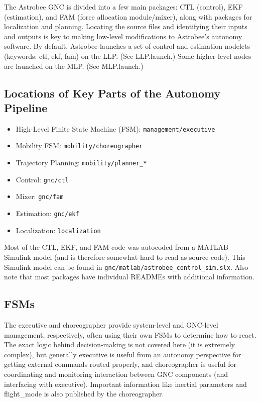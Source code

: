 \documentclass{article}
\begin{document}
The Astrobee GNC is divided into a few main packages: CTL (control), EKF (estimation), and FAM (force allocation module/mixer), along with packages for localization and planning. Locating the source files and identifying their inputs and outputs is key to making low-level modifications to Astrobee's autonomy software. By default, Astrobee launches a set of control and estimation nodelets (keywords: ctl, ekf, fam) on the LLP. (See LLP.launch.) Some higher-level nodes are launched on the MLP. (See MLP.launch.)

\subsection{Locations of Key Parts of the Autonomy Pipeline}
\begin{itemize}
 	\item High-Level Finite State Machine (FSM): \texttt{management/executive}
	\item Mobility FSM: \texttt{mobility/choreographer}
    \item Trajectory Planning: \texttt{mobility/planner\_*}
    \item Control: \texttt{gnc/ctl}
    \item Mixer: \texttt{gnc/fam}
    \item Estimation:  \texttt{gnc/ekf}
    \item Localization: \texttt{localization}
\end{itemize}

Most of the CTL, EKF, and FAM code was autocoded from a MATLAB Simulink model (and is therefore somewhat hard to read as source code). This Simulink model can be found in \texttt{gnc/matlab/astrobee\_control\_sim.slx}. Also note that most packages have individual READMEs with additional information.

\subsection{FSMs}

The executive and choreographer provide system-level and GNC-level management, respectively, often using their own FSMs to determine how to react. The exact logic behind decision-making is not covered here (it is extremely complex), but generally executive is useful from an autonomy perspective for getting external commands routed properly, and choreographer is useful for coordinating and monitoring interaction between GNC components (and interfacing with executive). Important information like inertial parameters and flight\_mode is also published by the choreographer.
\end{document}
